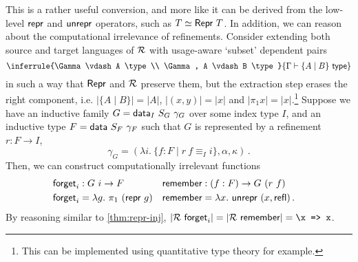 This is a rather useful conversion, and more like it can be derived from the
low-level $\textsf{repr}$ and $\textsf{unrepr}$ operators, such as $T \simeq \textsf{Repr}\
T$. In addition, we can reason about the computational irrelevance of
refinements. Consider extending both source and target languages of $\mathcal{R}$ with
usage-aware `subset' dependent pairs
\[
\inferrule{\Gamma \vdash A \type \\ \Gamma, A \vdash B \type}{\Gamma \vdash \{A \mid B\} \type}
\]
in such a way that $\textsf{Repr}$ and $\mathcal{R}$ preserve them, but the extraction step
erases the right component, i.e. $|\{A \mid B\}| = |A|$, $|(x, y)| = |x|$ and
$|\pi_1 x| = |x|$.\footnote{This can be implemented using quantitative type
theory for example.} Suppose we have an inductive family $G = \textsf{data}_I\ S_G\
\gamma_G$ over some index type $I$, and an inductive type $F = \textsf{data}\ S_F\
\gamma_F$ such that $G$ is represented by a refinement $r : F \to I$,
\[
    \gamma_G = (\lambda i.\ \{ f : F \mid r\ f \equiv_I i \}, \alpha, \kappa) \,.
\]
Then, we can construct computationally irrelevant functions
\begin{align*}
&\begin{aligned}
&\textsf{forget}_i : G\ i \to F \\
&\textsf{forget}_i = \lambda g.\ \pi_1\ (\textsf{repr}\ g)
\end{aligned} \quad \begin{aligned}
&\textsf{remember} : (f : F) \to G\ (r\ f) \\
&\textsf{remember} = \lambda x.\ \textsf{unrepr}\ (x, \textsf{refl}) \,.
\end{aligned}
\end{align*}
By reasoning similar to \cref{thm:repr-inj}, $|\mathcal{R}\ \textsf{forget}_i| = |\mathcal{R}\
\textsf{remember}| = \texttt{\textbackslash x => x}$.
